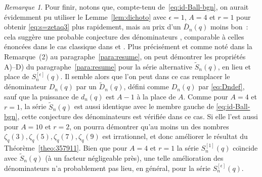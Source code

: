 \documentclass[12pt]{amsart}
\newcommand{\ep}{\epsilon}
\theoremstyle{remark}
\newtheorem*{remark}{Remarque}
\numberwithin{equation}{section}
\begin{document}
\begin{remark}
Pour finir, notons que, compte-tenu de~\eqref{eq:id-Ball-bgn}, 
on aurait {\'e}videmment pu utiliser le Lemme~\ref{lem:dichoto} 
avec $\ep=1$, $A=4$ et $r=1$ pour obtenir 
\eqref{eq:s=zetaq3} plus rapidement, mais au prix d'un $\bar D_n(q)$ 
moins bon~: cela 
sugg{\`e}re une probable {\og conjecture des d{\'e}nominateurs \fg}, 
comparable {\`a} celles 
{\'e}nonc{\'e}es dans le cas classique dans \cite{ri2} et \cite{zud0}.
Plus pr{\'e}cis{\'e}ment et comme not{\'e} dans la 
Remarque~(2) au paragraphe~\ref{para:resume}, on peut d{\'e}montrer les 
propri{\'e}t{\'e}s A)--D) du paragraphe~\ref{para:resume} pour
la s{\'e}rie alternative $\tilde S_n(q)$, en lieu et place de $S_n^{[\ep]}(q)$. 
Il semble alors que l'on peut dans ce cas remplacer le {\og 
d{\'e}nominateur\fg} $D_n(q)$ par un $\tilde D_n(q)$,
d{\'e}fini comme $D_n(q)$ par \eqref{eq:Dndef}, sauf que la puissance de
$d_n(q)$ est $A-1$ {\`a} la place de $A$. 
Comme pour $A=4$ et $r=1$, la 
s{\'e}rie $\tilde S_n(q)$ est aussi identique avec le membre gauche de 
\eqref{eq:id-Ball-bgn}, cette {\og conjecture des d{\'e}nominateurs\fg}
est v{\'e}rifi{\'e}e dans ce cas. Si elle l'est aussi 
pour $A=10$ et $r=2$, on pourra
d{\'e}montrer qu'au moins un des nombres $\zeta_q(3),\zeta_q(5),
\zeta_q(7),\zeta_q(9)$ est irrationnel, et donc am{\'e}liorer le
r{\'e}sultat du Th{\'e}or{\`e}me~\ref{theo:357911}.
Bien que pour $A=4$ et $r=1$ la s{\'e}rie $S_n^{[1]}(q)$ co{\"\i}ncide
avec $\tilde S_n(q)$ ({\`a} un facteur n{\'e}gligeable pr{\`e}s),
une telle am{\'e}lioration des d{\'e}nominateurs 
n'a probablement pas lieu, en g{\'e}n{\'e}ral,
pour la s{\'e}rie $S_n^{[\ep]}(q)$.
\end{remark}
\end{document}
